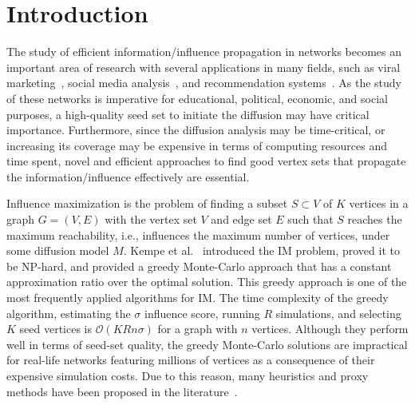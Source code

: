 \documentclass[10pt,journal,compsoc]{IEEEtran}
\begin{document}
% 
% 
% 
% 
% 
% 
% 
% 
% 

\maketitle

\IEEEdisplaynontitleabstractindextext
\IEEEpeerreviewmaketitle


\ifCLASSOPTIONcompsoc
{}
\else
\section{Introduction}
\label{sec:introduction}
\fi

The study of efficient information/influence propagation in networks becomes an important area of research with several applications in many fields, such as viral marketing~\cite{leskovec2007dynamics, trusov2009effects}, social media analysis~\cite{zeng2010social, moreno2004dynamics}, and recommendation systems~\cite{lu2012recommender}.
As the study of these networks is imperative for educational, political, economic, and social purposes, a high-quality seed set to initiate the diffusion may have critical importance.
Furthermore, since the diffusion analysis may be time-critical, or increasing its coverage may be expensive in terms of computing resources and time spent, novel and efficient approaches to find good vertex sets that propagate the information/influence effectively are essential.

Influence maximization is the problem of finding a subset $S \subset V$ of $K$ vertices in a graph $G = (V, E)$ with the vertex set $V$ and edge set $E$ such that $S$ reaches the maximum reachability, i.e., influences the maximum number of vertices, under some diffusion model $M$. Kempe et al.~\cite{kempe2003maximizing} introduced the IM problem, proved it to be NP-hard, and provided a greedy Monte-Carlo approach that has a constant approximation ratio over the optimal solution. This greedy approach is one of the most frequently applied algorithms for IM. The time complexity of the greedy algorithm, estimating the $\sigma$ influence score, running $R$ simulations, and selecting $K$ seed vertices is $\mathcal{O}(KRn\sigma)$ for a graph with $n$ vertices. Although they perform well in terms of seed-set quality, the greedy Monte-Carlo solutions are impractical for real-life networks featuring millions of vertices as a consequence of their expensive simulation costs. Due to this reason, many heuristics and proxy methods have been proposed in the literature~\cite{MixGreedy, narayanam2010shapley, kimura2007extracting, chen2010PMIA,chen2010LDAG, kim2013scalable, cohen2014sketch, goyal2011simpath, jung2012irie,cheng2014imrank,liu2014influence,galhotra2016holistic}.
\end{document}
